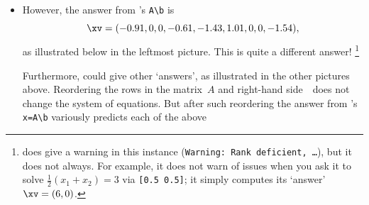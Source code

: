 \begin{example}
\begin{itemize}
although it is perhaps more appealing to put these factors into the shape of the \(3\times3\) array of pixels as in (and as illustrated to the right, see \cref{tbl:mtlbimag})
\begin{align*}&
\begin{bmatrix} r_1&r_4&r_7\\r_2&r_5&r_8\\r_3&r_6&r_9 \end{bmatrix}
=\begin{bmatrix} 0.66&0.63&0.53
\\0.68&0.65&0.55
\\0.91&0.87&0.74
 \end{bmatrix}.
&&\raisebox{-4ex}{\temp{0.66}{0.68}{0.91}{0.63}{0.65}{0.87}{0.53}{0.55}{0.74}}
\end{align*}
\script[2]'s answer predicts that there is less transmitting, more absorbing, denser, material to the top-right; and more transmitting, less absorbing, less dense, material to the bottom-left.

\item 
However, the answer from \script[1]'s \verb|A\b| is \twodp
\begin{equation*}
\xv=\small(-0.91,0,0,-0.61,-1.43,1.01,0,0,-1.54),
\end{equation*}
as illustrated below in the leftmost picture.  This is quite a different answer!%
\footnote{\script[1] does give a warning in this instance (\texttt{Warning: Rank deficient, \ldots}), but it does not always. 
For example, it does not warn of issues when you ask it to solve \(\frac12(x_1+x_2)=3\) via \texttt{[0.5 0.5]}; it simply computes its `answer' \(\xv=(6,0)\).}
\begin{center}
\hfil
{}
\hfil
{}
\hfil
{}
\end{center}
Furthermore, \script[1] could give other `answers', as illustrated in the other pictures above. 
Reordering the rows in the matrix~\(A\) and right-hand side~\bv\  does not change the system of equations.
But after such reordering the answer from \script[1]'s \verb|x=A\b|  variously predicts each of the above 
\end{itemize}



\end{example}
